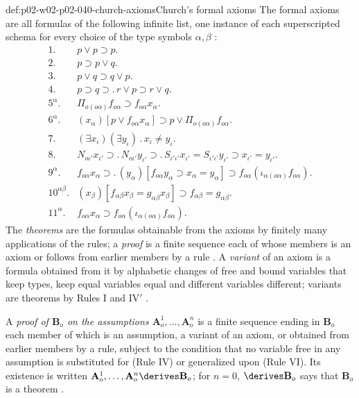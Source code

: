 \begin{hbdefinition}{def:p02-w02-p02-040-church-axioms}{Church's formal axioms}
The formal axioms are all formulas of the following infinite list, one
instance of each superscripted schema for every choice of the type symbols
\(\alpha,\beta\) \cite[\S4, pp.~60--61]{Church1940}:
\[
\begin{array}{rl}
 1. & p\vee p\supset p.\\
 2. & p\supset p\vee q.\\
 3. & p\vee q\supset q\vee p.\\
 4. & p\supset q\supset.\,r\vee p\supset r\vee q.\\
 5^\alpha. & \Pi_{o(o\alpha)}f_{o\alpha}\supset f_{o\alpha}x_\alpha.\\
 6^\alpha. & (x_\alpha)[p\vee f_{o\alpha}x_\alpha]\supset p\vee\Pi_{o(o\alpha)}f_{o\alpha}.\\
 7. & (\exists x_\iota)(\exists y_\iota)\,.\,x_\iota\neq y_\iota.\\
 8. & N_{o\iota'}x_{\iota'}\supset.\,N_{o\iota'}y_{\iota'}\supset.\,S_{\iota'\iota'}x_{\iota'}=S_{\iota'\iota'}y_{\iota'}\supset x_{\iota'}=y_{\iota'}.\\
 9^\alpha. & f_{o\alpha}x_\alpha\supset.\,(y_\alpha)[f_{o\alpha}y_\alpha\supset x_\alpha=y_\alpha]\supset f_{o\alpha}(\iota_{\alpha(o\alpha)}f_{o\alpha}).\\
 10^{\alpha\beta}. & (x_\beta)[f_{\alpha\beta}x_\beta=g_{\alpha\beta}x_\beta]\supset f_{\alpha\beta}=g_{\alpha\beta}.\\
 11^\alpha. & f_{o\alpha}x_\alpha\supset f_{o\alpha}(\iota_{\alpha(o\alpha)}f_{o\alpha}).
\end{array}
\]
The \emph{theorems} are the formulas obtainable from the axioms by finitely
many applications of the rules; a \emph{proof} is a finite sequence each of
whose members is an axiom or follows from earlier members by a rule
\cite[\S4, p.~61]{Church1940}.  A \emph{variant} of an axiom is a formula
obtained from it by alphabetic changes of free and bound variables that
keep types, keep equal variables equal and different variables different;
variants are theorems by Rules I and IV\('\) \cite[\S5, p.~62]{Church1940}.

A \emph{proof of \(\mathbf B_o\) on the assumptions
\(\mathbf A^1_o,\ldots,\mathbf A^n_o\)} is a finite sequence ending in
\(\mathbf B_o\) each member of which is an assumption, a variant of an axiom,
or obtained from earlier members by a rule, subject to the condition that
no variable free in any assumption is substituted for (Rule IV) or
generalized upon (Rule VI).  Its existence is written
\(\mathbf A^1_o,\ldots,\mathbf A^n_o\derives\mathbf B_o\); for \(n=0\),
\(\derives\mathbf B_o\) says that \(\mathbf B_o\) is a theorem
\cite[\S5, p.~62]{Church1940}.
\end{hbdefinition}

